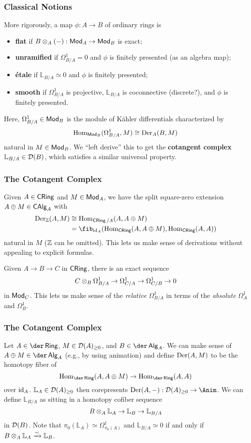 \documentclass[11pt]{beamer}
\newcommand{\LL}{\mathbb{L}}
\begin{document}
\begin{frame}
\frametitle{Classical Notions}
\pause More rigorously, a map $\phi: A\to B$ of ordinary rings is
\begin{itemize}
\pause\item \textbf{flat} if $B\otimes_A(-): \operatorname{\mathsf{Mod}}_A\to\operatorname{\mathsf{Mod}}_B$ is exact;
\pause\item \textbf{unramified} if $\Omega_{B/A}^1=0$ and $\phi$ is finitely presented (as an algebra map);
\pause\item \textbf{\'{e}tale} if $\LL_{B/A}\simeq0$ and $\phi$ is finitely presented;
\pause\item \textbf{smooth} if $\Omega_{B/A}^1$ is projective, $\LL_{B/A}$ is coconnective (discrete?), and $\phi$ is finitely presented.
\end{itemize}
\pause Here, $\Omega_{B/A}^1\in\operatorname{\mathsf{Mod}}_B$ is the module of K\"{a}hler differentials characterized by
$$\operatorname{Hom}_{\operatorname{\mathsf{Mod}}_B}(\Omega_{B/A}^1,M)\cong\operatorname{Der}_A(B,M)$$
natural in $M\in\operatorname{\mathsf{Mod}}_B$. \pause We ``left derive'' this to get the \textbf{cotangent complex} $\LL_{B/A}\in\D(B)$, which satisfies a similar universal property.
\end{frame}

\begin{frame}
\frametitle{The Cotangent Complex}
\pause Given $A\in\operatorname{\mathsf{CRing}}$ and $M\in\operatorname{\mathsf{Mod}}_A$, we have the split square-zero extension $A\oplus M\in\operatorname{\mathsf{CAlg}}_A$ with
\begin{align*}
\Der_{\Z}(A,M)
&\iso\Hom_{\CRing/A}(A,A\oplus M) \\
&=\fib_{\id_A}(\Hom_{\CRing}(A,A\oplus M),\Hom_{\CRing}(A,A))
\end{align*}
natural in $M$ ($\mathbb{Z}$ can be omitted). This lets us make sense of derivations without appealing to explicit formulas.

\pause Given $A\to B\to C$ in $\operatorname{\mathsf{CRing}}$, there is an exact sequence
$$C\otimes_B\Omega_{B/A}^1\to\Omega_{C/A}^1\to\Omega_{C/B}^1\to0$$
in $\operatorname{\mathsf{Mod}}_C$. This lets us make sense of the \emph{relative} $\Omega_{B/A}^1$ in terms of the \emph{absolute} $\Omega_A^1$ and $\Omega_B^1$.
\end{frame}

\begin{frame}
\frametitle{The Cotangent Complex}
\pause Let $A\in\der\Ring$, $M\in\mathcal{D}(A)_{\geq0}$, and $B\in\der\Alg_A$. \pause We can make sense of $A\oplus M\in\der\Alg_A$ (e.g., by using animation) and define $\operatorname{Der}(A,M)$ to be the homotopy fiber of 
$$\Hom_{\der\Ring}(A,A\oplus M)\to\Hom_{\der\Ring}(A,A)$$
over $\operatorname{id}_A$. \pause $\LL_A\in\D(A)_{\geq0}$ then corepresents $\Der(A,-): \D(A)_{\geq0}\to\Anim$. \pause We can define $\LL_{B/A}$ as sitting in a homotopy cofiber sequence
$$B\tensor_A\LL_A\to\LL_B\to\LL_{B/A}$$
in $\mathcal{D}(B)$. \pause Note that $\pi_0(\LL_A)\simeq\Omega_{\pi_0(A)}^1$ and $\LL_{B/A}\simeq0$ if and only if $B\tensor_A\LL_A\xto{\sim}\LL_B$.
\end{frame}
\end{document}

